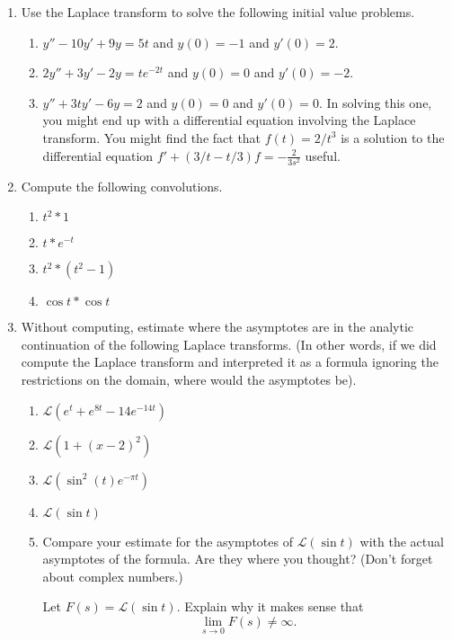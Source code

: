 \documentclass[letter]{article}
\begin{document}
\begin{enumerate}
		\item Use the Laplace transform to solve the following initial value problems.
			\begin{enumerate}
				\item $y''-10y'+9y=5t$ and $y(0)=-1$ and $y'(0)=2$.
				\item $2y''+3y'-2y=te^{-2t}$ and $y(0)=0$ and $y'(0)=-2$.
				\item $y''+3ty'-6y=2$ and $y(0)=0$ and $y'(0)=0$.  In solving this one, you might
					end up with a differential equation involving the Laplace transform.
					You might find the fact that $f(t) = 2/t^3$ is a solution to
					the differential equation $f'+(3/t-t/3)f = -\frac{2}{3s^2}$ useful.
			\end{enumerate}
		\item Compute the following convolutions.
			\begin{enumerate}
				\item $t^2 * 1$
				\item $t*e^{-t}$
				\item $t^2*(t^2-1)$
				\item $\cos t*\cos t$
			\end{enumerate}
		\item Without computing, estimate where the asymptotes are in
			the analytic continuation of the following Laplace transforms.
			(In other words, if we did compute the Laplace transform
			and interpreted it as a formula ignoring the restrictions on 
			the domain, where would the asymptotes be).
			\begin{enumerate}
				\item $\mathscr{L}(e^t+e^{8t}-14e^{-14t})$
				\item $\mathscr L(1+(x-2)^2)$
				\item $\mathscr L(\sin^2(t)e^{-\pi t})$
				\item $\mathscr L(\sin t)$
				\item Compare your estimate for the asymptotes of $\mathscr L(\sin t)$ with
					the actual asymptotes of the formula.  Are they where you thought?
					(Don't forget about complex numbers.)

					Let $F(s) = \mathscr L(\sin t)$.  Explain why it makes sense that 
					\[
						\lim_{s\to 0} F(s) \neq \infty.
					\]


\end{enumerate}
\end{enumerate}
\end{document}
